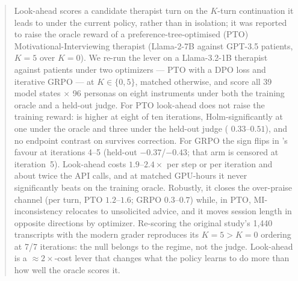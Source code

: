 \begin{abstract}
Look-ahead scores a candidate therapist turn on the $K$-turn continuation it leads to under the
current policy, rather than in isolation; it was reported to raise the oracle reward of a
preference-tree-optimised (PTO) Motivational-Interviewing therapist (Llama-2-7B against GPT-3.5
patients, $K{=}5$ over $K{=}0$). We re-run the lever on a Llama-3.2-1B therapist against
\primaryjudge{} patients under two optimizers --- PTO with a DPO loss and iterative GRPO --- at
$K \in \{0, 5\}$, matched otherwise, and score all 39 model states $\times$ 96 personas on eight
instruments under both the training oracle and a held-out judge. For PTO look-ahead does not raise the training reward:
\Kz{} is higher at eight of ten iterations, Holm-significantly at one under the oracle and three
under the held-out judge (\dz{} $0.33$--$0.51$), and no endpoint contrast on \QQ{} survives correction.
For GRPO the sign flips in \Kf{}'s favour at iterations 4--5 (held-out \dz{} $-0.37$/$-0.43$;
that arm is censored at iteration~5). Look-ahead costs $1.9$--$2.4\times$ per step or per
iteration and about twice the API calls, and at matched GPU-hours it never significantly beats
\Kz{} on the training oracle.
Robustly, it closes the over-praise channel (per turn, PTO \dz{} $1.2$--$1.6$; GRPO
$0.3$--$0.7$) while, in PTO, MI-inconsistency relocates to unsolicited advice, and it moves
session length in opposite directions by optimizer. Re-scoring the original study's 1{,}440 transcripts with the modern grader
reproduces its $K{=}5 > K{=}0$ ordering at 7/7 iterations: the null belongs to the regime, not
the judge. Look-ahead is a ${\approx}2\times$-cost lever that changes what the policy learns to
do more than how well the oracle scores it.
\end{abstract}

